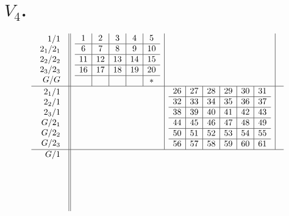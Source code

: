 \documentclass{amsart}
\begin{document}
\section*{$V_4$.}
\label{sec:v_4}


\begin{align*}
  \begin{array}{r||c|c|c}
    \begin{array}{r}
      1/1 \\ 2_1/2_1 \\ 2_2/2_2 \\ 2_3/2_3 \\ G/G \\
    \end{array}
&
\begin{array}{c|c|c|c|c}
1 & 2 & 3 & 4 & 5 \\ \hline
6 & 7 & 8 & 9 & 10 \\\hline
11 & 12 & 13 & 14 & 15 \\\hline
16 & 17 & 18 & 19 & 20 \\\hline
   &  &  &  & * \\
\end{array}
&& \\ \hline
    \begin{array}{r}
      2_1/1 \\ 2_2/1 \\ 2_3/1 \\ G/2_1 \\ G/2_2 \\ G/2_3 \\
    \end{array}
&&
  \begin{array}{c|c|c|c|c|c}
26 & 27 & 28 & 29 & 30 & 31 \\\hline
32 & 33 & 34 & 35 & 36 & 37 \\\hline
38 & 39 & 40 & 41 & 42 & 43 \\\hline
44 & 45 & 46 & 47 & 48 & 49 \\\hline
50 & 51 & 52 & 53 & 54 & 55 \\\hline
56 & 57 & 58 & 59 & 60 & 61 \\
  \end{array}
& \\ \hline
    \begin{array}{r}
      G/1 \\ \\ \\ \\ \\ \\

\end{array}
\end{array}
\end{align*}
\end{document}
